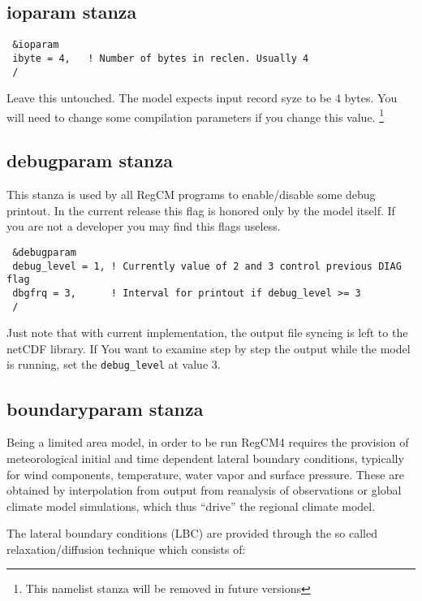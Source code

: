 \subsection{ioparam stanza}

{\footnotesize
\begin{Verbatim}
 &ioparam
 ibyte = 4,   ! Number of bytes in reclen. Usually 4
 /
\end{Verbatim}
}

Leave this untouched. The model expects input record syze to be 4 bytes.
You will need to change some compilation parameters if you change this value.
\footnote{This namelist stanza will be removed in future versions}

\subsection{debugparam stanza}

This stanza is used by all RegCM programs to enable/disable some debug printout.
In the current release this flag is honored only by the model itself. If you
are not a developer you may find this flags useless.

{\footnotesize
\begin{Verbatim}
 &debugparam
 debug_level = 1, ! Currently value of 2 and 3 control previous DIAG flag
 dbgfrq = 3,      ! Interval for printout if debug_level >= 3
 /
\end{Verbatim}
}

Just note that with current implementation, the output file syncing is left
to the netCDF library. If You want to examine step by step the output while
the model is running, set the \verb=debug_level= at value 3.

\subsection{boundaryparam stanza}

Being a limited area model, in order to be run RegCM4 requires the provision
of meteorological initial and time dependent lateral boundary conditions,
typically for wind components, temperature, water vapor and surface pressure.
These are obtained by interpolation from output from reanalysis of observations
or global climate model simulations, which thus “drive” the regional climate
model.

The lateral boundary conditions (LBC) are provided through the so called
relaxation/diffusion technique which consists of:

